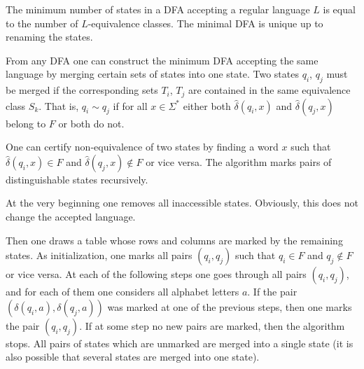 \begin{page}
\setcounter{section}{4}
\setcounter{subsection}{3}
\setcounter{dfn}{8}
\label{portion:1199}

\begin{cor}
The minimum number of states in a DFA accepting a regular language $L$ is equal to the number of $L$-equivalence classes.
The minimal DFA is unique up to renaming the states.
\end{cor}

\end{page}

\begin{page}
\setcounter{section}{4}
\setcounter{subsection}{3}
\setcounter{dfn}{8}
\label{portion:1200}



From any DFA one can construct the minimum DFA accepting the same language by merging certain sets of states into one state.
Two states $q_i$, $q_j$ must be merged if the corresponding sets $T_i$, $T_j$ are contained in the same equivalence class $S_k$.
That is, $q_i \sim q_j$ if for all $x \in \Sigma^*$ either both $\widehat{\delta}(q_i, x)$ and $\widehat{\delta}(q_j, x)$ belong to $F$ or both do not.

One can certify non-equivalence of two states by finding a word $x$ such that $\widehat{\delta}(q_i, x) \in F$ and $\widehat{\delta}(q_j, x) \notin F$
or vice versa.
The algorithm marks pairs of distinguishable states recursively.

At the very beginning one removes all inaccessible states.
Obviously, this does not change the accepted language.

Then one draws a table whose rows and columns are marked by the remaining states.
As initialization, one marks all pairs $(q_i,q_j)$ such that $q_i \in F$ and $q_j \notin F$ or vice versa.
At each of the following steps one goes through all pairs $(q_i,q_j)$, and for each of them one considers all alphabet letters $a$.
If the pair $(\delta(q_i,a), \delta(q_j,a))$ was marked at one of the previous steps, then one marks the pair $(q_i, q_j)$.
If at some step no new pairs are marked, then the algorithm stops.
All pairs of states which are unmarked are merged into a single state
(it is also possible that several states are merged into one state).


\end{page}

